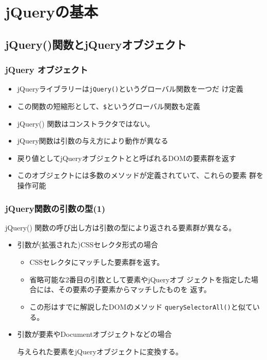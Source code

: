 \documentclass[dvipsk]{beamer}
\begin{document}
\section{jQueryの基本}
\subsection{jQuery()関数とjQueryオブジェクト}
\begin{frame}[containsverbatim]
\frametitle{jQuery オブジェクト}
\begin{itemize}
 \item jQueryライブラリーは\texttt{jQuery()}というグローバル関数を一つだ
       け定義
 \item この関数の短縮形として、\texttt{\$}というグローバル関数も定義
 \item jQuery() 関数はコンストラクタではない。
 \item jQuery関数は引数の与え方により動作が異なる
 \item 戻り値としてjQueryオブジェクトとと呼ばれるDOMの要素群を返す
 \item このオブジェクトには多数のメソッドが定義されていて、これらの要素
       群を操作可能
\end{itemize}
\end{frame}
\begin{frame}[containsverbatim]
\frametitle{jQuery関数の引数の型(1)}
jQuery() 関数の呼び出し方は引数の型により返される要素群が異なる。
\begin{itemize}
 \item 引数が(拡張された)CSSセレクタ形式の場合

\begin{itemize}
 \item CSSセレクタにマッチした要素群を返す。
 \item 省略可能な2番目の引数として要素やjQueryオブ
       ジェクトを指定した場合には、その要素の子要素からマッチしたものを
       返す。
 \item この形はすでに解説したDOMのメソッド
       \texttt{querySelectorAll()}と似ている。
\end{itemize}  
 \item 引数が要素やDocumentオブジェクトなどの場合

       与えられた要素をjQueryオブジェクトに変換する。
\end{itemize}
\end{frame}
\end{document}
